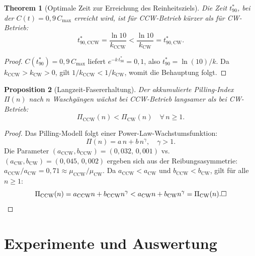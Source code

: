 ﻿\documentclass[12pt,a4paper]{article}
\newtheorem{theorem}{Theorem}[section]
\newtheorem{proposition}[theorem]{Proposition}
\theoremstyle{remark}
\newcommand{\CCW}{\mathrm{CCW}}
\newcommand{\CW}{\mathrm{CW}}
\begin{document}
	\begin{theorem}[Optimale Zeit zur Erreichung des Reinheitsziels]
		\label{thm:zeit}
		Die Zeit $t_{90}^{*}$, bei der $C(t) = 0{,}9\,C_{\max}$ erreicht wird, ist
		für CCW-Betrieb kürzer als für CW-Betrieb:
		\begin{equation}
			t_{90,\CCW}^{*} = \frac{\ln 10}{k_{\CCW}} < \frac{\ln 10}{k_{\CW}} = t_{90,\CW}^{*}.
		\end{equation}
	\end{theorem}
	
	\begin{proof}
		$C(t_{90}^{*}) = 0{,}9\,C_{\max}$ liefert $e^{-k\,t_{90}^{*}} = 0{,}1$,
		also $t_{90}^{*} = \ln(10)/k$.
		Da $k_{\CCW} > k_{\CW} > 0$, gilt $1/k_{\CCW} < 1/k_{\CW}$,
		womit die Behauptung folgt.\hfill
	\end{proof}
	
	\begin{proposition}[Langzeit-Fasererhaltung]
		\label{prop:faser}
		Der akkumulierte Pilling-Index $\Pi(n)$ nach $n$ Waschgängen wächst bei CCW-Betrieb
		langsamer als bei CW-Betrieb:
		\begin{equation}
			\Pi_{\CCW}(n) < \Pi_{\CW}(n) \quad \forall\, n \geq 1.
		\end{equation}
	\end{proposition}
	
	\begin{proof}
		Das Pilling-Modell folgt einer Power-Law-Wachstumsfunktion:
		\begin{equation}
			\Pi(n) = a\,n + b\,n^{\gamma}, \quad \gamma > 1.
		\end{equation}
		Die Parameter $(a_{\CCW}, b_{\CCW}) = (0{,}032,\,0{,}001)$ vs.\
		$(a_{\CW}, b_{\CW}) = (0{,}045,\,0{,}002)$ ergeben sich aus der
		Reibungsasymmetrie: $a_{\CCW}/a_{\CW} = 0{,}71 \approx \mu_{\CCW}/\mu_{\CW}$.
		Da $a_{\CCW} < a_{\CW}$ und $b_{\CCW} < b_{\CW}$, gilt für alle $n \geq 1$:
		\begin{equation}
			\Pi_{\CCW}(n) = a_{\CCW}n + b_{\CCW}n^{\gamma}
			< a_{\CW}n + b_{\CW}n^{\gamma} = \Pi_{\CW}(n). \hfill\square
		\end{equation}
	\end{proof}
	
	\section{Experimente und Auswertung}
	\label{sec:experimente}
	
\end{document}
